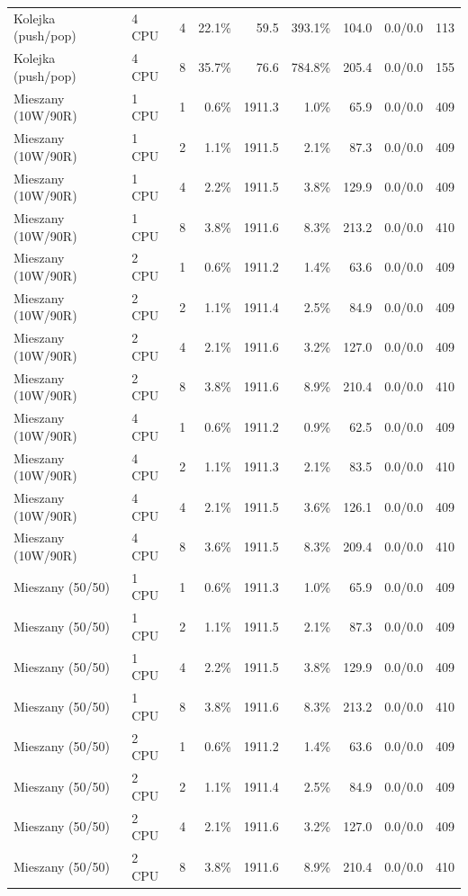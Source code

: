 \begin{table}[ht]
{\begin{tabular}{llcrrrrcc}
Kolejka (push/pop) & 4 CPU & 4 & 22.1\% & 59.5 & 393.1\% & 104.0 & 0.0/0.0 & 113 \\
Kolejka (push/pop) & 4 CPU & 8 & 35.7\% & 76.6 & 784.8\% & 205.4 & 0.0/0.0 & 155 \\
Mieszany (10W/90R) & 1 CPU & 1 & 0.6\% & 1911.3 & 1.0\% & 65.9 & 0.0/0.0 & 409 \\
Mieszany (10W/90R) & 1 CPU & 2 & 1.1\% & 1911.5 & 2.1\% & 87.3 & 0.0/0.0 & 409 \\
Mieszany (10W/90R) & 1 CPU & 4 & 2.2\% & 1911.5 & 3.8\% & 129.9 & 0.0/0.0 & 409 \\
Mieszany (10W/90R) & 1 CPU & 8 & 3.8\% & 1911.6 & 8.3\% & 213.2 & 0.0/0.0 & 410 \\
Mieszany (10W/90R) & 2 CPU & 1 & 0.6\% & 1911.2 & 1.4\% & 63.6 & 0.0/0.0 & 409 \\
Mieszany (10W/90R) & 2 CPU & 2 & 1.1\% & 1911.4 & 2.5\% & 84.9 & 0.0/0.0 & 409 \\
Mieszany (10W/90R) & 2 CPU & 4 & 2.1\% & 1911.6 & 3.2\% & 127.0 & 0.0/0.0 & 409 \\
Mieszany (10W/90R) & 2 CPU & 8 & 3.8\% & 1911.6 & 8.9\% & 210.4 & 0.0/0.0 & 410 \\
Mieszany (10W/90R) & 4 CPU & 1 & 0.6\% & 1911.2 & 0.9\% & 62.5 & 0.0/0.0 & 409 \\
Mieszany (10W/90R) & 4 CPU & 2 & 1.1\% & 1911.3 & 2.1\% & 83.5 & 0.0/0.0 & 410 \\
Mieszany (10W/90R) & 4 CPU & 4 & 2.1\% & 1911.5 & 3.6\% & 126.1 & 0.0/0.0 & 409 \\
Mieszany (10W/90R) & 4 CPU & 8 & 3.6\% & 1911.5 & 8.3\% & 209.4 & 0.0/0.0 & 410 \\
Mieszany (50/50) & 1 CPU & 1 & 0.6\% & 1911.3 & 1.0\% & 65.9 & 0.0/0.0 & 409 \\
Mieszany (50/50) & 1 CPU & 2 & 1.1\% & 1911.5 & 2.1\% & 87.3 & 0.0/0.0 & 409 \\
Mieszany (50/50) & 1 CPU & 4 & 2.2\% & 1911.5 & 3.8\% & 129.9 & 0.0/0.0 & 409 \\
Mieszany (50/50) & 1 CPU & 8 & 3.8\% & 1911.6 & 8.3\% & 213.2 & 0.0/0.0 & 410 \\
Mieszany (50/50) & 2 CPU & 1 & 0.6\% & 1911.2 & 1.4\% & 63.6 & 0.0/0.0 & 409 \\
Mieszany (50/50) & 2 CPU & 2 & 1.1\% & 1911.4 & 2.5\% & 84.9 & 0.0/0.0 & 409 \\
Mieszany (50/50) & 2 CPU & 4 & 2.1\% & 1911.6 & 3.2\% & 127.0 & 0.0/0.0 & 409 \\
Mieszany (50/50) & 2 CPU & 8 & 3.8\% & 1911.6 & 8.9\% & 210.4 & 0.0/0.0 & 410 \\

\end{tabular}}
\end{table}
